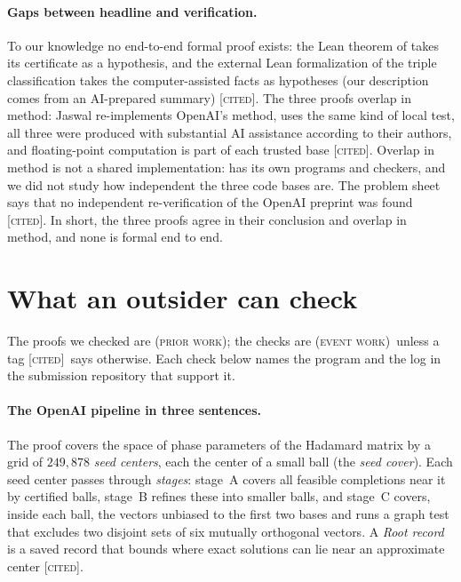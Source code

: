 \documentclass[11pt]{article}
\newcommand{\st}[1]{\textsc{[#1]}}
\newcommand{\stcited}{\st{cited}}
\newcommand{\event}{\textsc{(event work)}}
\newcommand{\prior}{\textsc{(prior work)}}
\theoremstyle{definition}
\theoremstyle{remark}
\begin{document}
\paragraph{Gaps between headline and verification.} To our knowledge no end-to-end formal proof exists: the Lean theorem
of \cite{CWT} takes its certificate as a hypothesis, and the external Lean formalization of the triple classification
\cite{YangLean} takes the computer-assisted facts as hypotheses (our description comes from an AI-prepared summary)
\stcited. The three proofs overlap in method: Jaswal re-implements OpenAI's method, \cite{CWT} uses the same kind of
local test, all three were produced with substantial AI assistance according to their authors, and floating-point
computation is part of each trusted base \stcited. Overlap in method is not a shared implementation: \cite{CWT} has
its own programs and checkers, and we did not study how independent the three code bases are. The problem sheet \cite{Sheet} says that no independent re-verification of the OpenAI
preprint was found \stcited. In short, the three proofs agree in their conclusion and overlap in method, and none is formal end to end.

\section{What an outsider can check}\label{sec:checks}

\noindent The proofs we checked are \prior; the checks are \event\ unless a tag \stcited\ says otherwise. Each check below names the program and the log in the submission repository that support it.

\paragraph{The OpenAI pipeline in three sentences.} The proof covers the space of phase parameters of the Hadamard matrix
by a grid of $249{,}878$ \emph{seed centers}, each the center of a small ball (the \emph{seed cover}). Each seed center
passes through \emph{stages}: stage~A covers all feasible completions near it by certified balls, stage~B refines these
into smaller balls, and stage~C covers, inside each ball, the vectors unbiased to the first two bases and runs a graph test
that excludes two disjoint sets of six mutually orthogonal vectors. A \emph{Root record} is a saved record that bounds
where exact solutions can lie near an approximate center \cite{OAI} \stcited.
\end{document}
